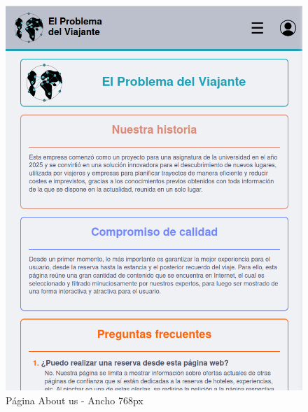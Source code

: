 \documentclass[11pt, a4paper]{book}
\begin{document}
	\begin{figure} [H]
		\centering
		\includegraphics[height=0.4\textheight]{CSS/3-5 768.png}
		\caption{Página About us - Ancho 768px}
	\end{figure}
\end{document}
